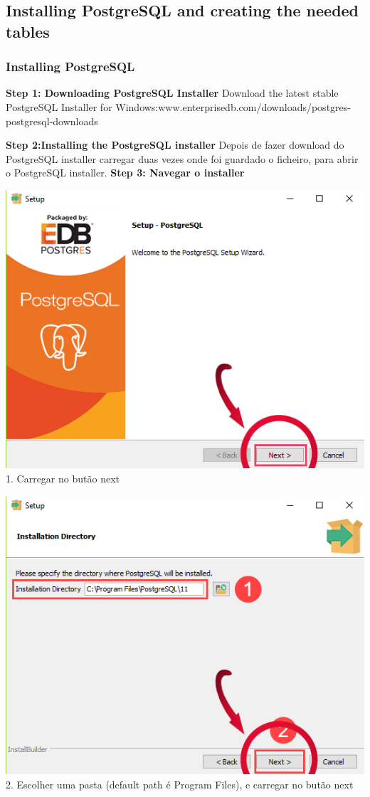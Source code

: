 \documentclass[a4paper, 11pt]{article}
\begin{document}
\subsection{Installing PostgreSQL and creating the needed tables}
\subsubsection{Installing PostgreSQL}
\textbf{Step 1: Downloading PostgreSQL Installer}
Download the latest stable PostgreSQL Installer for Windows:www.enterprisedb.com/downloads/postgres-postgresql-downloads

\textbf{Step 2:Installing the PostgreSQL installer}
Depois de fazer download do PostgreSQL installer carregar duas vezes onde foi guardado o ficheiro, para abrir o PostgreSQL installer.
\textbf{Step 3: Navegar o installer}

\begin{minipage}{0.45\textwidth}
  \includegraphics[width=\textwidth]{image.psd.png}
  1. Carregar no butão next
\end{minipage}\hfill
\begin{minipage}{0.45\textwidth}
  \includegraphics[width=\textwidth]{image.psd(1).png}
  2. Escolher uma pasta (default path é Program Files), e carregar no butão next
\end{minipage}
\end{document}
